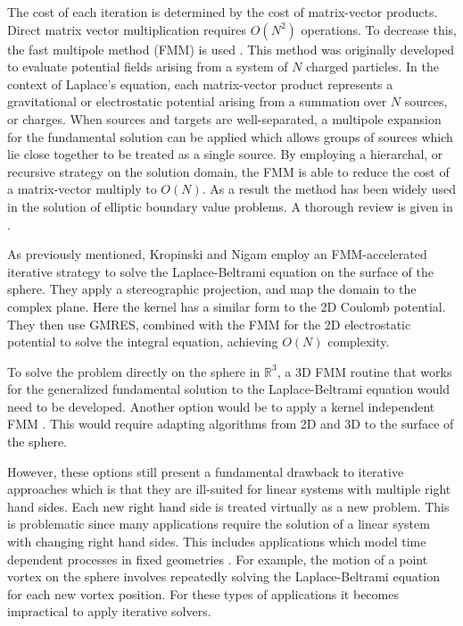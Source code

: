 \documentclass{sfuthesis}
\begin{document}
The cost of each iteration is determined by the cost of matrix-vector products. Direct matrix vector multiplication requires $O(N^2)$ operations. To decrease this, the  fast multipole method (FMM) is used \cite{CarrGreenRok88, Green88, GreenRok87}. This method was originally developed to evaluate potential fields arising from a system of $N$ charged particles. In the context of Laplace's equation, each matrix-vector product represents a gravitational or electrostatic potential arising from a summation over $N$ sources, or charges. When sources and targets are well-separated, a multipole expansion for the fundamental solution can be applied which allows groups of sources which lie close together to be treated as a single source. By employing a hierarchal, or recursive strategy on the solution domain, the FMM is able to reduce the cost of a matrix-vector multiply to $O(N)$. As a result the method has been widely used in the solution of elliptic boundary value problems. A thorough review is given in \cite{Nish2002}. 

As previously mentioned, Kropinski and Nigam \cite{KropNig2014} employ an FMM-accelerated iterative strategy to solve the Laplace-Beltrami equation on the surface of the sphere. They apply a stereographic projection, and map the domain to the complex plane. Here the kernel has a similar form to the 2D Coulomb potential. They then use GMRES, combined with the FMM for the 2D electrostatic potential to solve the integral equation, achieving $O(N)$ complexity. 

To solve the problem directly on the sphere in $\mathbb{R}^3$, a 3D FMM routine that works for the generalized fundamental solution to the Laplace-Beltrami equation would need to be developed. Another option would be to apply a kernel independent FMM \cite{Ying2004}. This would require adapting algorithms from 2D and 3D to the surface of the sphere.

However, these options still present a fundamental drawback to iterative approaches which is that they are  ill-suited for linear systems with multiple right hand sides. Each new right hand side is treated virtually as a new problem. This is problematic since many applications require the solution of a linear system with changing right hand sides. This includes applications which model time dependent processes in fixed geometries \cite{HoGreen2012}. For example, the motion of a point vortex on the sphere involves repeatedly solving the Laplace-Beltrami equation for each new vortex position. For these types of applications it becomes impractical to apply iterative solvers. 
\end{document}
